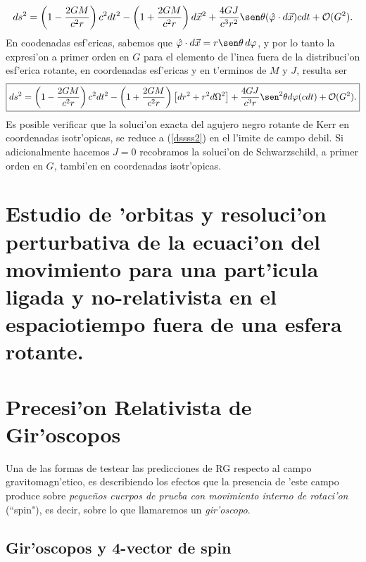 \begin{equation}
ds^2=\left(1-\frac{2GM}{c^2r}\right)c^2dt^2-\left(1+\frac{2GM}{c^2r}\right)d\vec{x}^2+\frac{4GJ}{c^3r^2}\sen\theta (\hat\varphi\cdot d\vec{x})cdt+\mathcal{O}(G^2).\label{ds22}
\end{equation}
En coodenadas esf'ericas, sabemos que $\hat\varphi\cdot d\vec{x}=r\sen\theta\,d\varphi$, y por lo tanto la expresi'on a primer orden en $G$ para el elemento de l'inea fuera de la distribuci'on esf'erica rotante, en coordenadas esf'ericas y en t'erminos de $M$ y $J$, resulta ser
\begin{equation}\boxed{
ds^2=\left(1-\frac{2GM}{c^2r}\right)c^2dt^2-\left(1+\frac{2GM}{c^2r}\right)\left[dr^2+r^2d\Omega^2\right]+\frac{4GJ}{c^3r}\sen^2 \theta d\varphi (cdt)+\mathcal{O}(G^2).}\label{dssss2}
\end{equation}
Es posible verificar que la soluci'on exacta del agujero negro rotante de Kerr en coordenadas isotr'opicas, se reduce a (\ref{dssss2}) en el l'imite de campo debil. Si adicionalmente hacemos $J=0$ recobramos la soluci'on de Schwarzschild, a primer orden en $G$, tambi'en en coordenadas isotr'opicas.

\section{Estudio de 'orbitas y resoluci'on perturbativa de la ecuaci'on del movimiento para una part'icula ligada y no-relativista en el espaciotiempo fuera de una esfera rotante.}

\section{Precesi'on Relativista de Gir'oscopos}

Una de las formas de testear las predicciones de RG respecto al campo gravitomagn'etico, es describiendo los efectos que la presencia de 'este campo produce sobre \textit{peque\~nos cuerpos de prueba con movimiento interno de rotaci'on} (``spin"), es decir, sobre lo que llamaremos un \textit{gir'oscopo}.

\subsection{Gir'oscopos y 4-vector de spin}

